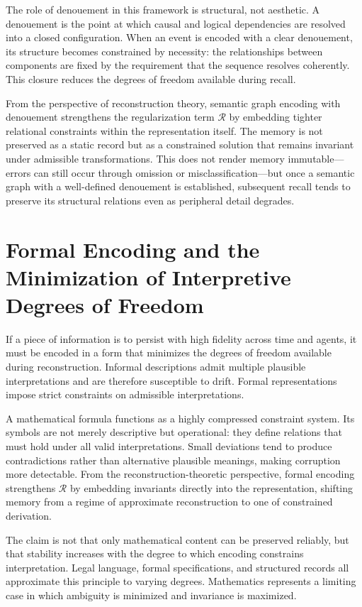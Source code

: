 \documentclass[12pt, letterpaper]{article}
\theoremstyle{flyxion}
\begin{document}
The role of denouement in this framework is structural, not aesthetic. A denouement is the point at which causal and logical dependencies are resolved into a closed configuration. When an event is encoded with a clear denouement, its structure becomes constrained by necessity: the relationships between components are fixed by the requirement that the sequence resolves coherently. This closure reduces the degrees of freedom available during recall.

From the perspective of reconstruction theory, semantic graph encoding with denouement strengthens the regularization term $\mathcal{R}$ by embedding tighter relational constraints within the representation itself. The memory is not preserved as a static record but as a constrained solution that remains invariant under admissible transformations. This does not render memory immutable---errors can still occur through omission or misclassification---but once a semantic graph with a well-defined denouement is established, subsequent recall tends to preserve its structural relations even as peripheral detail degrades.

\section{Formal Encoding and the Minimization of Interpretive Degrees of Freedom}

If a piece of information is to persist with high fidelity across time and agents, it must be encoded in a form that minimizes the degrees of freedom available during reconstruction. Informal descriptions admit multiple plausible interpretations and are therefore susceptible to drift. Formal representations impose strict constraints on admissible interpretations.

A mathematical formula functions as a highly compressed constraint system. Its symbols are not merely descriptive but operational: they define relations that must hold under all valid interpretations. Small deviations tend to produce contradictions rather than alternative plausible meanings, making corruption more detectable. From the reconstruction-theoretic perspective, formal encoding strengthens $\mathcal{R}$ by embedding invariants directly into the representation, shifting memory from a regime of approximate reconstruction to one of constrained derivation.

The claim is not that only mathematical content can be preserved reliably, but that stability increases with the degree to which encoding constrains interpretation. Legal language, formal specifications, and structured records all approximate this principle to varying degrees. Mathematics represents a limiting case in which ambiguity is minimized and invariance is maximized.
\end{document}
